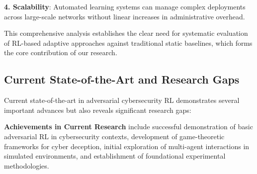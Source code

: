 \documentclass[12pt,oneside]{article}
\begin{document}
\textbf{4. Scalability}: Automated learning systems can manage complex deployments across large-scale networks without linear increases in administrative overhead.

This comprehensive analysis establishes the clear need for systematic evaluation of RL-based adaptive approaches against traditional static baselines, which forms the core contribution of our research.

\subsection{Current State-of-the-Art and Research Gaps}

Current state-of-the-art in adversarial cybersecurity RL demonstrates several important advances but also reveals significant research gaps:

\textbf{Achievements in Current Research} include successful demonstration of basic adversarial RL in cybersecurity contexts, development of game-theoretic frameworks for cyber deception, initial exploration of multi-agent interactions in simulated environments, and establishment of foundational experimental methodologies.
\end{document}
